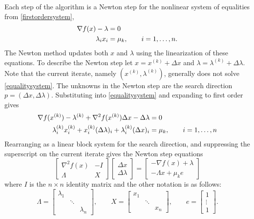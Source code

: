 \documentclass[11pt]{article}
\newcommand{\grad}{\nabla}
\begin{document}
Each step of the algorithm is a Newton step for the nonlinear system of equalities from \eqref{firstordersystem},
\begin{align}
\grad f(x) - \lambda &= 0 \label{equalitysystem} \\
\lambda_i x_i &= \mu_k, \qquad i=1,\dots,n. \notag
\end{align}
The Newton method updates both $x$ and $\lambda$ using the linearization of these equations.  To describe the Newton step let $x=x^{(k)}+\Delta x$ and $\lambda=\lambda^{(k)}+\Delta\lambda$.  Note that the current iterate, namely $(x^{(k)},\lambda^{(k)})$, generally does not solve \eqref{equalitysystem}.  The unknowns in the Newton step are the search direction $p=(\Delta x,\Delta \lambda)$.  Substituting into \eqref{equalitysystem} and expanding to first order gives
\begin{align}
\grad f(x^{(k)}) - \lambda^{(k)} + \grad^2 f(x^{(k)}) \Delta x - \Delta \lambda &= 0 \label{prenewtonstep} \\
\lambda_i^{(k)} x_i^{(k)} + x_i^{(k)} (\Delta\lambda)_i + \lambda_i^{(k)} (\Delta x)_i &= \mu_k, \qquad i=1,\dots,n \notag
\end{align}
Rearranging as a linear block system for the search direction, and suppressing the superscript on the current iterate gives the Newton step equations
\begin{equation}
\begin{bmatrix}
\grad^2 f(x) & - I \\
\Lambda & X
\end{bmatrix}
\begin{bmatrix}
\Delta x \\
\Delta \lambda
\end{bmatrix}
=
\begin{bmatrix}
-\grad f(x) + \lambda \\
-\Lambda x + \mu_k e
\end{bmatrix}
 \label{newtonstep}
\end{equation}
where $I$ is the $n\times n$ identity matrix and the other notation is as follows:
    $$\Lambda = \begin{bmatrix} \lambda_1 & & \\ & \ddots & \\ & & \lambda_n \end{bmatrix}, \qquad X = \begin{bmatrix} x_1 & & \\ & \ddots & \\ & & x_n \end{bmatrix}, \qquad e = \begin{bmatrix} 1 \\ \vdots \\ 1 \end{bmatrix}.$$
\end{document}
